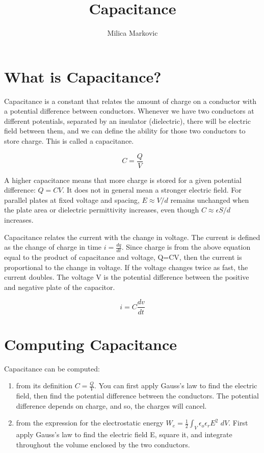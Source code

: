 \documentclass{ximera}
\title{Capacitance}
\author{Milica Markovic}
\begin{document}
  
\begin{abstract}  

\end{abstract}  
\maketitle    


\section{What is Capacitance?}
Capacitance is a constant that relates the amount of charge on a conductor with a potential difference between conductors. Whenever we have two conductors at different potentials, separated by an insulator (dielectric), there will be electric field between them, and we can define the ability for those two conductors to store charge. This is called a capacitance.

\begin{equation}
C=\frac{Q}{V}
\end{equation}

A higher capacitance means that more charge is stored for a given potential difference: $Q=CV$. It does not in general mean a stronger electric field. For parallel plates at fixed voltage and spacing, $E\approx V/d$ remains unchanged when the plate area or dielectric permittivity increases, even though $C\approx\epsilon S/d$ increases.

Capacitance relates the current with the change in voltage. The current is defined as the change of charge in time  $i=\frac{dq}{dt}$. Since charge is from the above equation equal to the product of capacitance and voltage, Q=CV, then the current is proportional to the change in voltage. If the voltage changes twice as fast, the current doubles. The voltage V is the potential  difference between the positive and negative plate of the capacitor. 

\begin{equation}
i=C \frac{dv}{dt}
\end{equation}


\section{Computing Capacitance}

Capacitance can be computed:

\begin{enumerate}
\item from its definition $C=\frac{Q}{V}$. You can first apply Gauss's law to find the electric field, then find the potential difference between the conductors. The potential difference depends on charge, and so, the charges will cancel.
\item from the expression for the electrostatic energy $W_e=\frac{1}{2} \int_V  \epsilon_o \epsilon_r E^2 \, \,dV$. First apply Gauss's law to find the electric field E, square it, and integrate throughout the volume enclosed by the two conductors. 
\end{enumerate}
\end{document}
